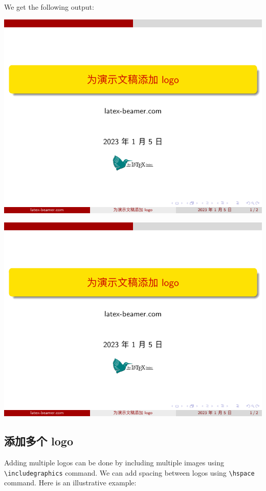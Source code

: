 \inputminted[linenos=true]{latex}{examples/beamer/logo-for-title-page.tex}

We get the following output:

\includegraphics[page=1]{examples/beamer/logo-for-title-page.pdf}

\includegraphics[page=2]{examples/beamer/logo-for-title-page.pdf}

\subsection{添加多个 logo}

Adding multiple logos can be done by including multiple images using \verb|\includegraphics| command. We can add spacing between logos using \verb|\hspace| command. Here is an illustrative example:

